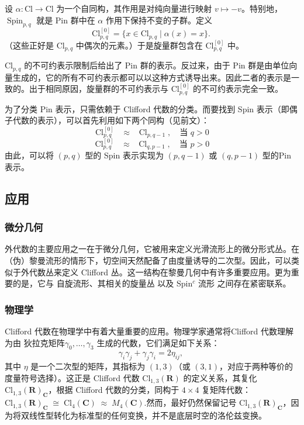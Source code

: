 设 $\alpha : \mathrm{Cl} \to \mathrm{Cl}$ 为一个自同构，其作用是对纯向量进行映射 $v \mapsto -v$。特别地，$\operatorname{Spin}_{p,q}$ 就是 Pin 群中在 $\alpha$ 作用下保持不变的子群。定义
$$
\mathrm{Cl}_{p,q}^{[0]} = \{ x \in \mathrm{Cl}_{p,q} \mid \alpha(x) = x \}.~
$$
（这些正好是 $\mathrm{Cl}_{p,q}$ 中偶次的元素。）于是旋量群包含在 $\mathrm{Cl}^{[0]}_{p,q}$ 中。

$\mathrm{Cl}_{p,q}$ 的不可约表示限制后给出了 Pin 群的表示。反过来，由于 Pin 群是由单位向量生成的，它的所有不可约表示都可以以这种方式诱导出来。因此二者的表示是一致的。出于相同原因，旋量群的不可约表示与 $\mathrm{Cl}^{[0]}_{p,q}$ 的不可约表示完全一致。

为了分类 Pin 表示，只需依赖于 Clifford 代数的分类。而要找到 Spin 表示（即偶子代数的表示），可以首先利用如下两个同构（见前文）：
$$
\operatorname{Cl}^{[0]}_{p,q} \;\;\approx\;\; \operatorname{Cl}_{p,q-1}, \quad \text{当 } q > 0~
$$
$$
\operatorname{Cl}^{[0]}_{p,q} \;\;\approx\;\; \operatorname{Cl}_{q,p-1}, \quad \text{当 } p > 0~
$$
由此，可以将 $(p,q)$ 型的 Spin 表示实现为 $(p, q-1)$ 或 $(q, p-1)$ 型的Pin 表示。
\subsection{应用}
\subsubsection{微分几何}
外代数的主要应用之一在于微分几何，它被用来定义光滑流形上的微分形式丛。在（伪）黎曼流形的情形下，切空间天然配备了由度量诱导的二次型。因此，可以类似于外代数丛来定义 Clifford 丛。这一结构在黎曼几何中有许多重要应用。更为重要的是，它与 自旋流形、其相关的旋量丛 以及 Spin$^c$ 流形 之间存在紧密联系。
\subsubsection{物理学}
Clifford 代数在物理学中有着大量重要的应用。物理学家通常将Clifford 代数理解为由 狄拉克矩阵$\gamma_0, \ldots, \gamma_3$ 生成的代数，它们满足如下关系：
$$
\gamma_i \gamma_j + \gamma_j \gamma_i = 2 \eta_{ij},~
$$
其中 $\eta$ 是一个二次型的矩阵，其指标为 $(1,3)$（或 $(3,1)$，对应于两种等价的度量符号选择）。这正是 Clifford 代数 $\mathrm{Cl}_{1,3}(\mathbf{R})$ 的定义关系，其复化$\mathrm{Cl}_{1,3}(\mathbf{R})_{\mathbf{C}}$，根据 Clifford 代数的分类，同构于 $4 \times 4$ 复矩阵代数：$\mathrm{Cl}_{1,3}(\mathbf{R})_{\mathbf{C}} \;\cong\; \mathrm{Cl}_{4}(\mathbf{C}) \;\approx\; M_4(\mathbf{C})$.然而，最好仍然保留记号 $\mathrm{Cl}_{1,3}(\mathbf{R})_{\mathbf{C}}$，因为将双线性型转化为标准型的任何变换，并不是底层时空的洛伦兹变换。


